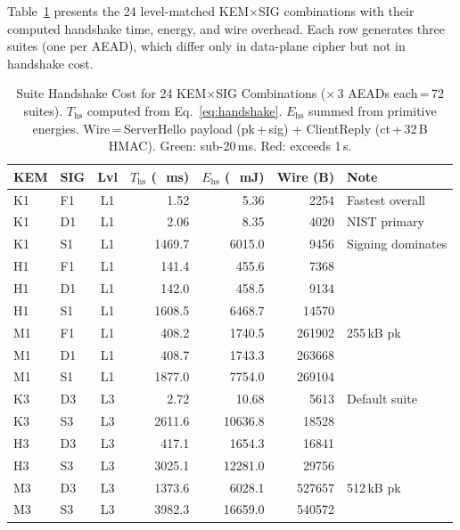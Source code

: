 \documentclass[conference]{IEEEtran}
\newcommand{\ms}{\,\si{\milli\second}}
\newcommand{\mJ}{\,\si{\milli\joule}}
\begin{document}
Table~\ref{tab:suites} presents the 24 level-matched KEM$\times$SIG
combinations with their computed handshake time, energy, and wire
overhead.  Each row generates three suites (one per AEAD), which
differ only in data-plane cipher but not in handshake cost.

\begin{table}[t]
\centering
\caption{Suite Handshake Cost for 24 KEM$\times$SIG Combinations ($\times$\,3 AEADs each\,=\,72 suites).
  $T_{\text{hs}}$ computed from Eq.~\eqref{eq:handshake}.
  $E_{\text{hs}}$ summed from primitive energies.
  Wire\,=\,ServerHello payload (pk\,+\,sig) + ClientReply (ct\,+\,32\,B HMAC).
  \colorbox{bestcell}{Green}: sub-20\,ms.
  \colorbox{worstcell}{Red}: exceeds 1\,s.}
\label{tab:suites}
\footnotesize
\setlength{\tabcolsep}{2.8pt}
\begin{tabular}{@{}l l c  r r r  l@{}}
\toprule
\textbf{KEM} & \textbf{SIG} & \textbf{Lvl}
  & $T_{\text{hs}}$ (\si{\ms}) & $E_{\text{hs}}$ (\si{\mJ}) & Wire (B) & \textbf{Note} \\
\midrule
\rowcolor{bestcell}
K1 & F1 & L1 & 1.52 & 5.36 & 2254 & Fastest overall \\
\rowcolor{bestcell}
K1 & D1 & L1 & 2.06 & 8.35 & 4020 & NIST primary \\
K1 & S1 & L1 & \cellcolor{worstcell}1469.7 & 6015.0 & 9456 & Signing dominates \\
H1 & F1 & L1 & 141.4 & 455.6 & 7368 & \\
H1 & D1 & L1 & 142.0 & 458.5 & 9134 & \\
H1 & S1 & L1 & \cellcolor{worstcell}1608.5 & 6468.7 & 14570 & \\
M1 & F1 & L1 & 408.2 & 1740.5 & 261902 & 255\,kB pk \\
M1 & D1 & L1 & 408.7 & 1743.3 & 263668 & \\
M1 & S1 & L1 & \cellcolor{worstcell}1877.0 & 7754.0 & 269104 & \\
\midrule
\rowcolor{bestcell}
K3 & D3 & L3 & 2.72 & 10.68 & 5613 & Default suite \\
K3 & S3 & L3 & \cellcolor{worstcell}2611.6 & 10636.8 & 18528 & \\
H3 & D3 & L3 & 417.1 & 1654.3 & 16841 & \\
H3 & S3 & L3 & \cellcolor{worstcell}3025.1 & 12281.0 & 29756 & \\
M3 & D3 & L3 & 1373.6 & 6028.1 & 527657 & 512\,kB pk \\
M3 & S3 & L3 & \cellcolor{worstcell}3982.3 & 16659.0 & 540572 & \\

\end{tabular}
\end{table}
\end{document}
